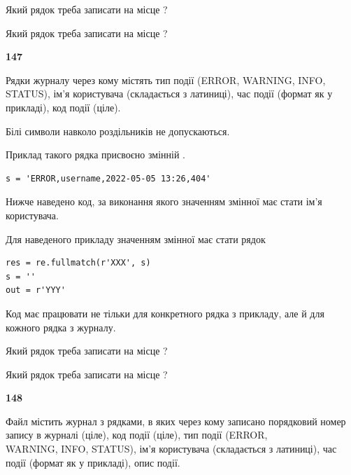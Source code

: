 Який рядок треба записати на місце  ?\par
\vspace{5mm}


Який рядок треба записати на місце  ?\par


\newpage

{\begin {center}\textbf{ 147}\end {center}}\par
Рядки журналу через кому містять тип події (ERROR, WARNING, INFO, STATUS), ім'я користувача (складається з латиниці), час події (фор\-мат як у прикладі), код події (ціле).

Білі символи навколо роздільників не допускаються.

Приклад такого рядка присвоєно змінній .



\begin{verbatim}
s = 'ERROR,username,2022-05-05 13:26,404'
\end{verbatim}


Нижче наведено код, за виконання якого значенням змінної  має стати ім'я користувача.

Для наведеного прикладу значенням змінної  має стати рядок 



\begin{verbatim}
res = re.fullmatch(r'XXX', s)
s = ''
out = r'YYY'
\end{verbatim}


Код має працювати не тільки для конкретного рядка з прикладу, але й для кожного рядка з журналу.




Який рядок треба записати на місце  ?\par
\vspace{5mm}


Який рядок треба записати на місце  ?\par


\newpage

{\begin {center}\textbf{ 148}\end {center}}\par
Файл  містить журнал з рядками, в яких через кому записано поряд\-ко\-вий номер запису в журналі (ціле), код події (ціле), тип події (ERROR, \\WARNING, INFO, STATUS), ім'я користувача (складається з латиниці), час події (фор\-мат як у прикладі), опис події.

